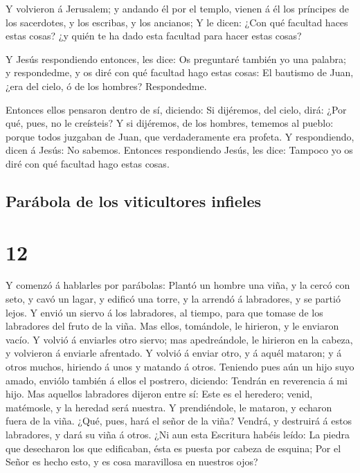  Y volvieron á Jerusalem; y andando él por el templo,
vienen á él los príncipes de los sacerdotes, y los escribas, y los
ancianos;  Y le dicen: ¿Con qué facultad haces estas
cosas? ¿y quién te ha dado esta facultad para hacer estas cosas?

 Y Jesús respondiendo entonces, les dice: Os preguntaré
también yo una palabra; y respondedme, y os diré con qué facultad hago
estas cosas:  El bautismo de Juan, ¿era del cielo, ó de
los hombres? Respondedme.

 Entonces ellos pensaron dentro de sí, diciendo: Si
dijéremos, del cielo, dirá: ¿Por qué, pues, no le creísteis?
 Y si dijéremos, de los hombres, tememos al pueblo:
porque todos juzgaban de Juan, que verdaderamente era profeta.
 Y respondiendo, dicen á Jesús: No sabemos. Entonces
respondiendo Jesús, les dice: Tampoco yo os diré con qué facultad hago
estas cosas.

\hypertarget{paruxe1bola-de-los-viticultores-infieles}{%
\subsection{Parábola de los viticultores
infieles}\label{paruxe1bola-de-los-viticultores-infieles}}

\hypertarget{section-41-12}{%
\section{12}\label{section-41-12}}

 Y comenzó á hablarles por parábolas: Plantó un hombre una
viña, y la cercó con seto, y cavó un lagar, y edificó una torre, y la
arrendó á labradores, y se partió lejos.  Y envió un
siervo á los labradores, al tiempo, para que tomase de los labradores
del fruto de la viña.  Mas ellos, tomándole, le hirieron,
y le enviaron vacío.  Y volvió á enviarles otro siervo;
mas apedreándole, le hirieron en la cabeza, y volvieron á enviarle
afrentado.  Y volvió á enviar otro, y á aquél mataron; y á
otros muchos, hiriendo á unos y matando á otros.  Teniendo
pues aún un hijo suyo amado, enviólo también á ellos el postrero,
diciendo: Tendrán en reverencia á mi hijo.  Mas aquellos
labradores dijeron entre sí: Este es el heredero; venid, matémosle, y la
heredad será nuestra.  Y prendiéndole, le mataron, y
echaron fuera de la viña.  ¿Qué, pues, hará el señor de la
viña? Vendrá, y destruirá á estos labradores, y dará su viña á otros.
 ¿Ni aun esta Escritura habéis leído: La piedra que
desecharon los que edificaban, ésta es puesta por cabeza de esquina;
 Por el Señor es hecho esto, y es cosa maravillosa en
nuestros ojos?

